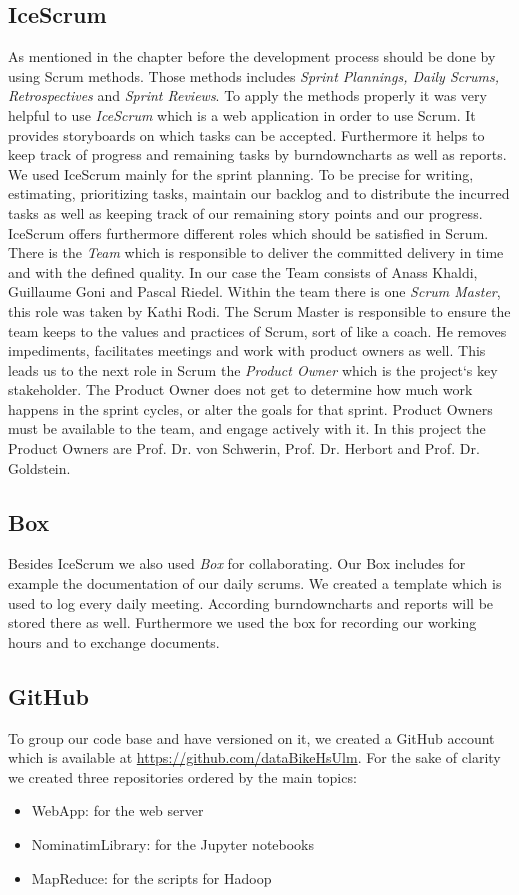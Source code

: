 \documentclass[12pt]{article}
\begin{document}
\subsection{IceScrum}
As mentioned in the chapter before the development process should be done by using Scrum methods.
Those methods includes \emph{Sprint Plannings, Daily Scrums, Retrospectives} and \emph{Sprint Reviews}.
To apply the methods properly it was very helpful to use \emph{IceScrum} which is a web application in order to use Scrum. It provides storyboards on which tasks can be accepted. Furthermore it helps to keep track of progress and remaining tasks by burndowncharts as well as reports. We used IceScrum mainly for the sprint planning. To be precise for writing, estimating, prioritizing tasks, maintain our backlog and to distribute the incurred tasks as well as keeping track of our remaining story points and our progress.
\\IceScrum offers furthermore different roles which should be satisfied in Scrum. 
There is the \emph{Team} which is responsible to deliver the committed delivery in time and with the defined quality. In our case the Team consists of Anass Khaldi, Guillaume Goni and Pascal Riedel. Within the team there is one \emph{Scrum Master}, this role was taken by Kathi Rodi. The Scrum Master is responsible to ensure the team keeps to the values and practices of Scrum, sort of like a coach. He  removes impediments, facilitates meetings and work with product owners as well. This leads us to the next role in Scrum the \emph{Product Owner} which is the project`s key stakeholder. The Product Owner does not get to determine how much work happens in the sprint cycles, or alter the goals for that sprint. Product Owners must be available to the team, and engage actively with it. In this project the Product Owners are Prof. Dr. von Schwerin, Prof. Dr. Herbort and Prof. Dr. Goldstein.
\subsection{Box}
Besides IceScrum we also used \emph{Box} for collaborating.  Our Box includes for example the documentation of our daily scrums. We created a template which is used to log every daily meeting. According burndowncharts and reports will be stored there as well. Furthermore we used the box for recording our working hours and to exchange documents.
\subsection{GitHub}
To group our code base and have versioned on it, we created a GitHub account which is available at 
\href{https://github.com/dataBikeHsUlm}{https://github.com/dataBikeHsUlm}.
For the sake of clarity we created three repositories ordered by the main topics:
\begin{itemize}
\item WebApp: for the web server
\item NominatimLibrary: for the Jupyter notebooks
\item MapReduce: for the scripts for Hadoop
\end{itemize}
\end{document}
